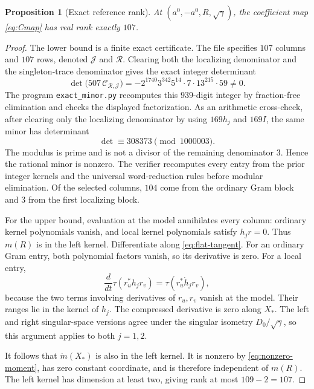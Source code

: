 \documentclass[11pt]{article}
\newtheorem{proposition}[theorem]{Proposition}
\theoremstyle{remark}\newtheorem{remark}[theorem]{Remark}
\newcommand{\calC}{\mathcal C}
\begin{document}
\begin{proposition}[Exact reference rank]\label{prop:rank107}
At $(a^0,-a^0,R,\sqrt\gamma)$, the coefficient map \eqref{eq:Cmap} has real rank exactly $107$.
\end{proposition}
\begin{proof}
The lower bound is a finite exact certificate. The file  specifies $107$ columns and $107$ rows, denoted $\mathcal J$ and $\mathcal R$. Clearing both the localizing denominator and the singleton-trace denominator gives the exact integer determinant
\begin{equation}\label{eq:exactdet}
 \det\bigl(507\,\calC_{\mathcal R,\mathcal J}\bigr)
 =-2^{1740}3^{342}5^{14}\cdot7\cdot13^{215}\cdot59\ne0.
\end{equation}
The program \texttt{exact\_minor.py} recomputes this $939$-digit integer by fraction-free elimination and checks the displayed factorization. As an arithmetic cross-check, after clearing only the localizing denominator by using $169h_j$ and $169I$, the same minor has determinant
\begin{equation}\label{eq:moddet}
 \det\equiv308373\pmod{1000003}.
\end{equation}
The modulus is prime and is not a divisor of the remaining denominator $3$. Hence the rational minor is nonzero. The verifier recomputes every entry from the prior integer kernels and the universal word-reduction rules before modular elimination. Of the selected columns, $104$ come from the ordinary Gram block and $3$ from the first localizing block.

For the upper bound, evaluation at the model annihilates every column: ordinary kernel polynomials vanish, and local kernel polynomials satisfy $h_jr=0$. Thus $m(R)$ is in the left kernel. Differentiate along \eqref{eq:flat-tangent}. For an ordinary Gram entry, both polynomial factors vanish, so its derivative is zero. For a local entry,
\[
 \frac{d}{dt}\tau(r_u^*h_jr_v)
 =\tau(r_u^*\dot h_jr_v),
\]
because the two terms involving derivatives of $r_u,r_v$ vanish at the model. Their ranges lie in the kernel of $h_j$. The compressed derivative is zero along $X_*$. The left and right singular-space versions agree under the singular isometry $D_0/\sqrt\gamma$, so this argument applies to both $j=1,2$.

It follows that $\dot m(X_*)$ is also in the left kernel. It is nonzero by \eqref{eq:nonzero-moment}, has zero constant coordinate, and is therefore independent of $m(R)$. The left kernel has dimension at least two, giving rank at most $109-2=107$.
\end{proof}
\end{document}
